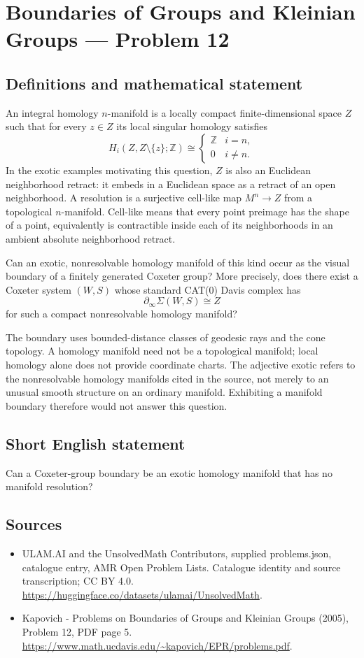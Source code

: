 \documentclass[11pt,a4paper]{article}
\begin{document}
\section*{Boundaries of Groups and Kleinian Groups — Problem 12}\label{statement}

\subsection{Definitions and mathematical statement}
An integral homology $n$-manifold is a locally compact finite-dimensional space $Z$ such that for every $z\in Z$ its local singular homology satisfies
\[
 H_i(Z,Z\setminus\{z\};\mathbb Z)\cong
 \begin{cases}\mathbb Z&i=n,\\0&i\ne n.\end{cases}
\]
In the exotic examples motivating this question, $Z$ is also an Euclidean neighborhood retract: it embeds in a Euclidean space as a retract of an open neighborhood. A resolution is a surjective cell-like map $M^n\to Z$ from a topological $n$-manifold. Cell-like means that every point preimage has the shape of a point, equivalently is contractible inside each of its neighborhoods in an ambient absolute neighborhood retract.

Can an exotic, nonresolvable homology manifold of this kind occur as the visual boundary of a finitely generated Coxeter group? More precisely, does there exist a Coxeter system $(W,S)$ whose standard CAT(0) Davis complex has
\[
 \partial_\infty\Sigma(W,S)\cong Z
\]
for such a compact nonresolvable homology manifold?

The boundary uses bounded-distance classes of geodesic rays and the cone topology. A homology manifold need not be a topological manifold; local homology alone does not provide coordinate charts. The adjective exotic refers to the nonresolvable homology manifolds cited in the source, not merely to an unusual smooth structure on an ordinary manifold. Exhibiting a manifold boundary therefore would not answer this question.
\subsection{Short English statement}
Can a Coxeter-group boundary be an exotic homology manifold that has no manifold resolution?
\subsection{Sources}
\begin{itemize}
\item[S1] ULAM.AI and the UnsolvedMath Contributors, supplied problems.json, catalogue entry, AMR Open Problem Lists. Catalogue identity and source transcription; CC BY 4.0.
\url{https://huggingface.co/datasets/ulamai/UnsolvedMath}.
\item[S2] Kapovich - Problems on Boundaries of Groups and Kleinian Groups (2005), Problem 12, PDF page 5. 
\url{https://www.math.ucdavis.edu/~kapovich/EPR/problems.pdf}.
\end{itemize}
\end{document}
